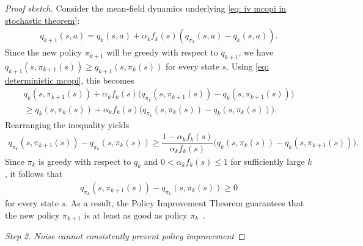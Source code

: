 \documentclass{article}
\begin{document}
\begin{proof}[Proof sketch]
Consider the mean-field dynamics underlying \eqref{eq: iv mcopi in stochastic theorem}:
\begin{align}
\label{eq: deterministic mcopi}
    q_{k+1}(s,a)
    =
    q_k(s,a) + \alpha_k f_k(s) (q_{\pi_k}(s,a) - q_k(s,a)) .
\end{align}
Since the new policy $\pi_{k+1}$ will be greedy with respect to $q_{k+1}$, we have $q_{k+1}(s,\pi_{k+1}(s)) \ge q_{k+1}(s, \pi_k(s))$ for every state $s$.
Using \eqref{eq: deterministic mcopi}, this becomes
\begin{multline*}    
    q_k(s, \pi_{k+1}(s)) + \alpha_k 
    f_k(s)
    \big( q_{\pi_k}(s, \pi_{k+1}(s)) - q_k(s, \pi_{k+1}(s)) \big)
    \\
    \ge
    q_k(s, \pi_k(s)) + \alpha_k 
    f_k(s)
    \big( q_{\pi_k}(s, \pi_k(s)) - q_k(s, \pi_k(s)) \big) .
\end{multline*}
Rearranging the inequality
yields
\begin{align*}    
    q_{\pi_k}(s, \pi_{k+1}(s)) - q_{\pi_k}(s, \pi_k(s))
    \ge
    \dfrac{1 - \alpha_k f_k(s)}{\alpha_k f_k(s)}
    \big( q_k(s, \pi_k(s)) - q_k(s, \pi_{k+1}(s)) \big) .
\end{align*}
Since $\pi_k$ is greedy with respect to $q_k$ and $0 < \alpha_k f_k(s) \le 1$ for sufficiently large $k$, 
it follows that
\begin{align*}
    q_{\pi_k}(s, \pi_{k+1}(s)) - q_{\pi_k}(s, \pi_k(s)) \ge 0
\end{align*}
for every state $s$.
As a result, the Policy Improvement Theorem guarantees that the new policy $\pi_{k+1}$ is at least as good as policy $\pi_k$~\cite{Sutton2018ReinforcementIntroduction}.


\textit{Step 2. Noise cannot consistently prevent policy improvement}


\end{proof}
\end{document}
